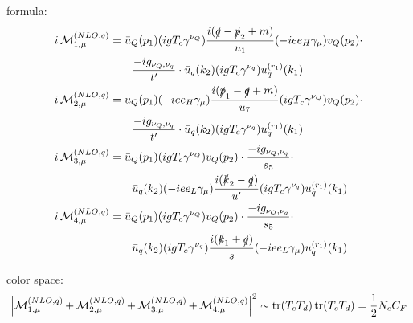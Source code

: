 formula:
\begin{align}
i\operatorname{\mathcal M}^{(NLO,q)}_{1,\mu} &= \bar u_Q(p_1)(igT_c\gamma^{\nu_Q})\frac{i(\slashed{q}-\slashed{p}_2+m)}{u_1}(-i e e_H \gamma_\mu)v_Q(p_2)\cdot \nonumber\\
 &\hspace{20pt}\frac{-ig_{\nu_Q,\nu_q}}{t'} \cdot \bar u_q(k_2)(igT_c\gamma^{\nu_q})u^{(r_1)}_q(k_1)\\
i\operatorname{\mathcal M}^{(NLO,q)}_{2,\mu} &= \bar u_Q(p_1)(-i e e_H \gamma_\mu)\frac{i(\slashed{p}_1-\slashed{q}+m)}{u_7}(igT_c\gamma^{\nu_Q})v_Q(p_2) \cdot \nonumber\\
&\hspace{20pt} \frac{-ig_{\nu_Q,\nu_q}}{t'} \cdot \bar u_q(k_2)(igT_c\gamma^{\nu_q})u^{(r_1)}_q(k_1)\\
i\operatorname{\mathcal M}^{(NLO,q)}_{3,\mu} &= \bar u_Q(p_1)(igT_c\gamma^{\nu_Q})v_Q(p_2) \cdot \frac{-ig_{\nu_Q,\nu_q}}{s_5} \cdot \nonumber\\
 &\hspace{20pt}\bar u_q(k_2)(-i e e_L \gamma_\mu)\frac{i(\slashed{k}_2-\slashed{q})}{u'}(igT_c\gamma^{\nu_q})u^{(r_1)}_q(k_1)\\
i\operatorname{\mathcal M}^{(NLO,q)}_{4,\mu} &= \bar u_Q(p_1)(igT_c\gamma^{\nu_Q})v_Q(p_2) \cdot \frac{-ig_{\nu_Q,\nu_q}}{s_5} \cdot \nonumber\\
 &\hspace{20pt}\bar u_q(k_2)(igT_c\gamma^{\nu_q})\frac{i(\slashed{k}_1+\slashed{q})}{s}(-i e e_L \gamma_\mu)u^{(r_1)}_q(k_1)
\end{align}

color space:
\begin{equation}
\left|\operatorname{\mathcal M}^{(NLO,q)}_{1,\mu}+\operatorname{\mathcal M}^{(NLO,q)}_{2,\mu}+\operatorname{\mathcal M}^{(NLO,q)}_{3,\mu}+\operatorname{\mathcal M}^{(NLO,q)}_{4,\mu}\right|^2 \sim \operatorname{\text{tr}}(T_c T_d)\operatorname{\text{tr}}(T_c T_d) = \frac 1 2 N_c C_F
\end{equation}

